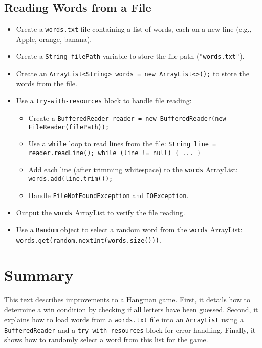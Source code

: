 \documentclass{article}
\begin{document}
\begin{itemize}
\subsection{Reading Words from a File}

\begin{itemize}
    \item Create a \texttt{words.txt} file containing a list of words, each on a new line (e.g., Apple, orange, banana).
    \item Create a \texttt{String filePath} variable to store the file path (\texttt{"words.txt"}).
    \item Create an \texttt{ArrayList<String> words = new ArrayList<>();} to store the words from the file.
    \item Use a \texttt{try-with-resources} block to handle file reading:
    \begin{itemize}
        \item Create a \texttt{BufferedReader reader = new BufferedReader(new FileReader(filePath));}
        \item Use a \texttt{while} loop to read lines from the file: \texttt{String line = reader.readLine(); while (line != null) \{ ... \}}
        \item Add each line (after trimming whitespace) to the \texttt{words} ArrayList: \texttt{words.add(line.trim());}
        \item Handle \texttt{FileNotFoundException} and \texttt{IOException}.
    \end{itemize}
    \item Output the \texttt{words} ArrayList to verify the file reading.
    \item Use a \texttt{Random} object to select a random word from the \texttt{words} ArrayList: \texttt{words.get(random.nextInt(words.size()))}.
\end{itemize}

\section{Summary}

This text describes improvements to a Hangman game.  First, it details how to determine a win condition by checking if all letters have been guessed. Second, it explains how to load words from a \texttt{words.txt} file into an \texttt{ArrayList} using a \texttt{BufferedReader} and a \texttt{try-with-resources} block for error handling. Finally, it shows how to randomly select a word from this list for the game.



\end{itemize}
\end{document}
